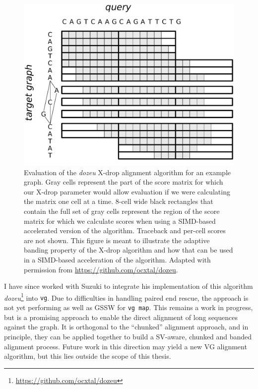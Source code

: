 \begin{figure}[htbp!] 
\centering    
\includegraphics[width=1.0\textwidth]{Chapter2/Figs/xdrop.pdf}
\caption[The \emph{dozeu} X-drop alignment algorithm]{
  Evaluation of the \emph{dozeu} X-drop alignment algorithm for an example graph.
  Gray cells represent the part of the score matrix for which our X-drop parameter would allow evaluation if we were calculating the matrix one cell at a time.
  8-cell wide black rectangles that contain the full set of gray cells represent the region of the score matrix for which we calculate scores when using a SIMD-based accelerated version of the algorithm.
  Traceback and per-cell scores are not shown.
  This figure is meant to illustrate the adaptive banding property of the X-drop algorithm and how that can be used in a SIMD-based acceleration of the algorithm.
  Adapted with permission from \url{https://github.com/ocxtal/dozeu}.
}
\label{fig:xdrop}
\end{figure}

I have since worked with Suzuki to integrate his implementation of this algorithm \emph{dozeu}\footnote{\url{https://github.com/ocxtal/dozeu}} into {\tt vg}.
Due to difficulties in handling paired end rescue, the approach is not yet performing as well as GSSW for {\tt vg map}.
This remains a work in progress, but is a promising approach to enable the direct alignment of long sequences against the graph.
It is orthogonal to the ``chunked'' alignment approach, and in principle, they can be applied together to build a SV-aware, chunked and banded alignment process.
Future work in this direction may yield a new VG alignment algorithm, but this lies outside the scope of this thesis.

